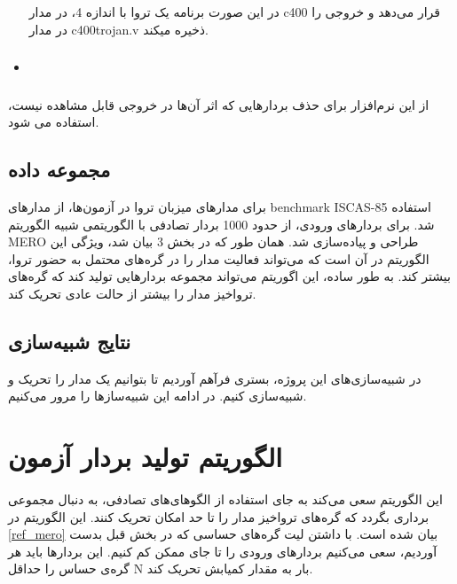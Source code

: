 \begin{itemize}
\begin{center}
		
	\end{center}
	در این صورت برنامه یک تروا با اندازه 4، در مدار c400 قرار می‌دهد و خروجی را در مدار c400trojan.v ذخیره میکند.
	\item \subsubsection{}
	
\end{itemize}
از این نرم‌افزار برای حذف بردارهایی که اثر آن‌ها در خروجی قابل مشاهده نیست، استفاده می شود.

\subsection{مجموعه ‌داده}
برای مدارهای میزبان تروا در آزمون‌ها، از مدارهای benchmark ISCAS-85 استفاده شد. 
برای بردارهای ورودی، از حدود 1000 بردار تصادفی با الگوریتمی شبیه الگوریتم MERO طراحی و پیاده‌سازی شد. همان طور که در بخش 3 بیان شد، ویژگی این الگوریتم در آن است که می‌تواند فعالیت مدار را در گره‌های محتمل به حضور تروا، بیشتر کند. به طور ساده، این اگوریتم می‌تواند مجموعه بردارهایی تولید کند که گره‌های تروا‌خیز مدار را بیشتر از حالت عادی تحریک کند.

\subsection{نتایج شبیه‌سازی}
در شبیه‌سازی‌ها‌‌ی این پروژه، بستری فرآهم آوردیم تا بتوانیم یک مدار را تحریک و شبیه‌سازی کنیم. در ادامه این شبیه‌سازها را مرور می‌کنیم.
\section{الگوریتم تولید بردار آزمون} 
این الگوریتم سعی می‌کند به جای استفاده از الگوهای‌های تصادفی، به دنبال مجموعی برداری بگردد که گره‌های تروا‌خیز مدار را تا حد امکان تحریک کنند.  این الگوریتم در \ref{ref_mero} بیان شده است. با داشتن لیت گره‌های حساسی که در بخش قبل بدست آوردیم، سعی می‌کنیم بردارهای ورودی را تا جای ممکن کم کنیم. این بردارها باید هر گره‌ی حساس را حداقل N بار به مقدار کمیابش تحریک کند.\\



